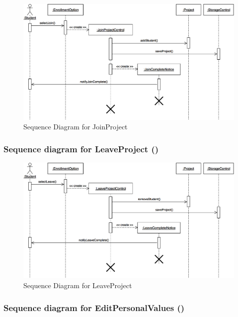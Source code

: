 \documentclass[12pt,letterpaper]{article}
\begin{document}
\begin{figure}[H]
	\centering{}
	\includegraphics[scale=0.3]{imgs/seq/join-project.png}
	\caption{Sequence Diagram for JoinProject}
\end{figure}

\subsubsection*{Sequence diagram for LeaveProject (\leaveproject{})}

\begin{figure}[H]
	\centering{}
	\includegraphics[scale=0.3]{imgs/seq/leave-project.png}
	\caption{Sequence Diagram for LeaveProject}
\end{figure}

\subsubsection*{Sequence diagram for EditPersonalValues (\editpersonalvalues{})}
\end{document}

